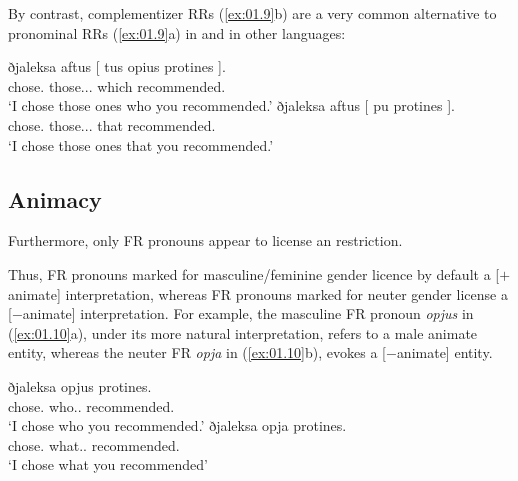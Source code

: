 \documentclass[output=paper]{langsci/langscibook}
\begin{document}
\ea {}\label{ex:01.8}
	\z
\z

By contrast, complementizer \glspl{RR} (\ref{ex:01.9}b)  are a very common alternative to
pronominal \glspl{RR} (\ref{ex:01.9}a) in  and in other languages:

\ea {}\label{ex:01.9}
	\ea
		\gll ðjaleksa aftus [ {tus opius} protines ].\\
        chose.\Fsg{} those.\M.\Pl.\Acc{} {} which recommended.\Ssg{}\\
		\glt \enquote*{I chose those ones who you recommended.}
	\ex
		\gll ðjaleksa aftus [ pu protines ].\\
        chose.\Fsg{} those.\M.\Pl.\Acc{} {} that recommended.\Ssg{}\\
		\glt \enquote*{I chose those ones that you recommended.}
	\z
\z

\subsection{Animacy}
Furthermore, only \gls{FR} pronouns appear to
license an  restriction.

Thus, \gls{FR} pronouns marked for masculine/feminine gender licence by default
a [$+$animate] interpretation, whereas \gls{FR} pronouns  marked for neuter
gender license a [$-$animate] interpretation. For example, the masculine \gls{FR}
pronoun \emph{opjus} in (\ref{ex:01.10}a), under its more natural interpretation, refers to
a male animate entity, whereas the neuter \gls{FR} \emph{opja} in (\ref{ex:01.10}b), evokes
a [$-$animate] entity.\largerpage[2]

\ea {}\label{ex:01.10}
	\ea
		\gll ðjaleksa opjus protines.\\
			chose.\Fsg{} who.\M{}.\Pl{} recommended.\Ssg{}\\
		\glt \enquote*{I chose who you recommended.}
	\ex
		\gll ðjaleksa opja protines.\\
			chose.\Fsg{} what.\glossN.\Pl{} recommended.\Ssg{}\\
		\glt \enquote*{I chose what you recommended}
	\z
\z
\end{document}
